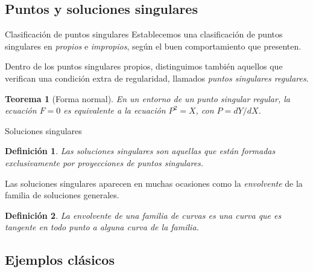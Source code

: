 \documentclass[10pt, spanish]{beamer}
\newtheorem{teorema}{Teorema}
\newtheorem{defi}{Definición}
\begin{document}
\subsection{Puntos y soluciones singulares}

\begin{frame}{Clasificación de puntos singulares}
  Establecemos una clasificación de puntos singulares en \textit{propios} e \textit{impropios}, según el buen comportamiento que presenten.
  \vspace{0.5em}

  Dentro de los puntos singulares propios, distinguimos también aquellos que verifican una condición extra de regularidad, llamados \textit{puntos singulares regulares}.
  \vspace{0.75em}
  \begin{teorema}[Forma normal]
    En un entorno de un punto singular regular, la ecuación $F=0$ es equivalente a la ecuación $P^2=X$, con $P=dY/dX$.
  \end{teorema}
\end{frame}

\begin{frame}{Soluciones singulares}
  \begin{defi}
    Las soluciones singulares son aquellas que están formadas exclusivamente por proyecciones de puntos singulares.
  \end{defi}

  Las soluciones singulares aparecen en muchas ocasiones como la \textit{envolvente} de la familia de soluciones generales.

  \vspace{0.5em}
  \begin{defi}
    La envolvente de una familia de curvas es una curva que es tangente en todo punto a alguna curva de la familia.
  \end{defi}
\end{frame}


\subsection{Ejemplos clásicos}
\end{document}
